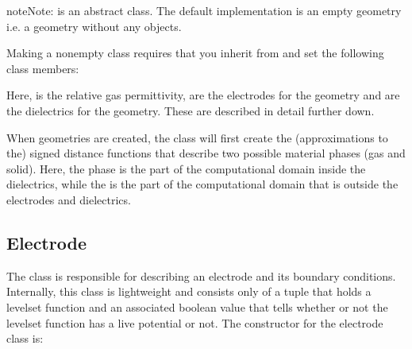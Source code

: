 \documentclass[letterpaper,10pt,english]{sphinxmanual}
\begin{document}
\begin{sphinxadmonition}{note}{Note:}
 is  an abstract class.
The default implementation is an empty geometry \textendash{} i.e. a geometry without any objects.
\end{sphinxadmonition}

Making a non\sphinxhyphen{}empty  class requires that you inherit from  and set the following class members:

\begin{sphinxVerbatim}[commandchars=\\\{\},formatcom=\scriptsize]
 
 
 
\end{sphinxVerbatim}

Here,  is the relative gas permittivity,  are the electrodes for the geometry and  are the dielectrics for the geometry.
These are described in detail further down.

When geometries are created, the  class will first create the (approximations to the) signed distance functions that describe two possible material phases (gas and solid).
Here, the  phase is the part of the computational domain inside the dielectrics, while the  is the part of the computational domain that is outside the electrodes and dielectrics.


\subsection{Electrode}
\label{\detokenize{Source/ComputationalGeometry:electrode}}\label{\detokenize{Source/ComputationalGeometry:chap-electrode}}
The  class is responsible for describing an electrode and its boundary conditions. Internally, this class is lightweight and consists only of a tuple that holds a level\sphinxhyphen{}set function and an associated boolean value that tells whether or not the level\sphinxhyphen{}set function has a live potential or not. The constructor for the electrode class is:
\end{document}

